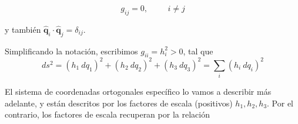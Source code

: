 \begin{equation}
g_{ij} = 0, \hspace{1cm} i \neq j
\label{eq:ecuacion_02_07}
\end{equation}

y también $\mathbf{\widehat{q}}_{i} \cdot \mathbf{\widehat{q}}_{j} = \delta_{ij}$.
\par
Simplificando la notación, escribimos $g_{ii} = h_{i}^{2} > 0$, tal que
\begin{equation}
ds^{2} = (h_{1} \: dq_{1})^{2} + (h_{2} \: dq_{2})^{2} + (h_{3} \: dq_{3})^{2} = \sum_{i} (h_{i} \: dq_{i})^{2} 
\label{eq:ecuacion_02_08}
\end{equation}

El sistema de coordenadas ortogonales específico lo vamos a describir más adelante, y están descritos por los factores de escala (positivos) $h_{1}, h_{2}, h_{3}$. Por el contrario, los factores de escala recuperan por la relación

